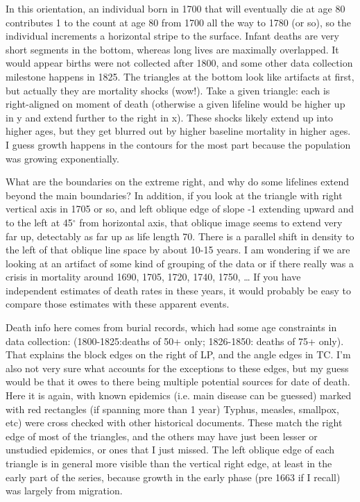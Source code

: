 \begin{small}
In this orientation, an individual born in 1700 that will eventually die at age
80 contributes 1 to the count at age 80 from 1700 all the way to 1780 (or so), so the individual increments a horizontal stripe to the surface. Infant deaths are very short segments in the bottom, whereas long lives are maximally overlapped. It would appear births were not collected after 1800, and some other data collection milestone happens in 1825. The triangles at the bottom look like artifacts at first, but actually they are mortality shocks (wow!). Take a given triangle: each is right-aligned on moment of death (otherwise a given lifeline would be higher up in y and extend further to the right in x). These shocks likely extend up into higher ages, but they get blurred out by higher baseline mortality in higher ages. I guess growth happens in the contours for the most part because the population was growing exponentially.

What are the boundaries on the extreme right, and why do some lifelines extend
beyond the main boundaries?  In addition, if you look at the triangle with right
vertical axis in 1705 or so, and left oblique edge of slope -1 extending upward
and to the left at 45$^\circ$ from horizontal axis, that oblique image seems to
extend very far up, detectably as far up as life length 70.  There is a parallel shift in density to the left of that oblique line space by about 10-15 years.  I am wondering if we are looking at an artifact of some kind of grouping of the data or if there really was a crisis in mortality around 1690, 1705, 1720, 1740, 1750, …  If you have independent estimates of death rates in these years, it would probably be easy to compare those estimates with these apparent events.

Death info here comes from burial records, which had some age constraints in
data collection: (1800-1825:deaths of 50+ only; 1826-1850: deaths of 75+ only).
That explains the block edges on the right of LP, and the angle edges in TC. I'm
also not very sure what accounts for the exceptions to these edges, but my guess would be that it owes to there being multiple potential sources for date of death. Here it is again, with known epidemics (i.e. main disease can be guessed) marked with red rectangles (if spanning more than 1 year)
\citep[cf Figure 1.1][]{mazan2011}Typhus, measles, smallpox, etc) were cross
checked with other historical documents. These match the right edge of most of the triangles, and the others may have just been lesser or unstudied epidemics, or ones that I just missed. The left oblique edge of each triangle is in general more visible than the vertical right edge, at least in the early part of the series, because growth in the early phase (pre 1663 if I recall) was largely from migration.


\end{small}
